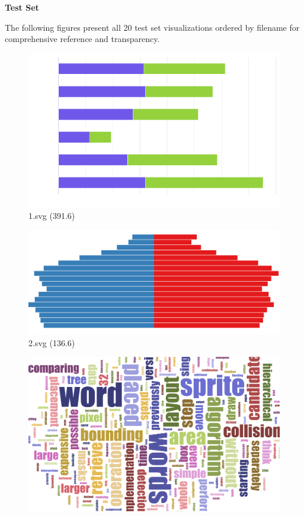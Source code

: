 \documentclass[journal]{IEEEtran}
\begin{document}
\textbf{Test Set}

The following figures present all 20 test set visualizations ordered by filename for comprehensive reference and transparency.

\vspace{1em}

\begin{figure}[!htbp]
\centering
\begin{minipage}{0.233\columnwidth}
\centering
\includegraphics[width=\textwidth]{Test_set/1.pdf}
{1.svg (391.6)}
\end{minipage}
\hfill
\begin{minipage}{0.233\columnwidth}
\centering
\includegraphics[width=\textwidth]{Test_set/2.pdf}
{2.svg (136.6)}
\end{minipage}
\hfill
\begin{minipage}{0.233\columnwidth}
\centering
\includegraphics[width=\textwidth]{Test_set/3.pdf}

\end{minipage}
\end{figure}
\end{document}
